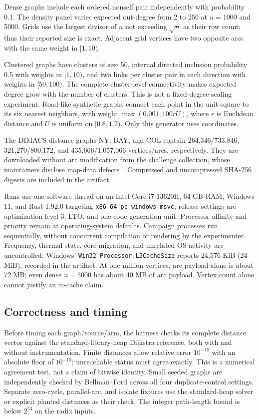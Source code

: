 \documentclass[11pt]{article}
\newcommand{\code}[1]{\texttt{#1}}
\begin{document}
Dense graphs include each ordered nonself pair independently with probability
0.1. The density panel varies expected out-degree from 2 to 256 at $n=1000$
and 5000. Grids use the largest divisor of $n$ not exceeding $\sqrt n$ as their
row count; thus their reported size is exact. Adjacent grid vertices have two
opposite arcs with the same weight in $[1,10)$.

Clustered graphs have clusters of size 50, internal directed inclusion probability
0.5 with weights in $[1,10)$, and two links per cluster pair in each direction
with weights in $[50,100)$. The complete cluster-level connectivity makes expected
degree grow with the number of clusters. This is not a fixed-degree scaling
experiment. Road-like synthetic graphs connect each point in the unit square to
its six nearest neighbors, with weight $\max(0.001,100rU)$, where $r$ is Euclidean
distance and $U$ is uniform on $[0.8,1.2)$. Only this generator uses coordinates.

The DIMACS distance graphs NY, BAY, and COL contain 264,346/733,846,
321,270/800,172, and 435,666/1,057,066 vertices/arcs, respectively.
They are downloaded without arc modification from the challenge collection,
whose maintainers disclose map-data defects~\cite{dimacs}. Compressed and
uncompressed SHA-256 digests are included in the artifact.

Runs use one software thread on an Intel Core i7-13620H, 64 GB RAM, Windows 11,
and Rust 1.92.0 targeting \code{x86\_64-pc-windows-msvc}; release settings are
optimization level 3, LTO, and one code-generation unit. Processor affinity and
priority remain at operating-system defaults. Campaign processes run sequentially,
without concurrent compilation or rendering by the experimenter. Frequency,
thermal state, core migration, and unrelated OS activity are uncontrolled.
Windows' \code{Win32\_Processor.L3CacheSize} reports 24,576 KiB (24 MiB),
recorded in the artifact. At one million vertices, arc payload alone
is about 72 MB; even dense $n=5000$ has about 40 MB of arc payload. Vertex count
alone cannot justify an in-cache claim.

\subsection{Correctness and timing}
Before timing each graph/source/arm, the harness checks its complete distance
vector against the standard-library-heap Dijkstra reference, both with and without instrumentation.
Finite distances allow relative error $10^{-10}$ with an absolute floor of
$10^{-10}$; unreachable status must agree exactly. This is a numerical agreement
test, not a claim of bitwise identity. Small seeded graphs are independently
checked by Bellman--Ford across all four duplicate-control settings. Separate
zero-cycle, parallel-arc, and isolate fixtures use the standard-heap solver or
explicit planted distances as their check. The integer path-length bound
is below $2^{53}$ on the radix inputs.
\end{document}
